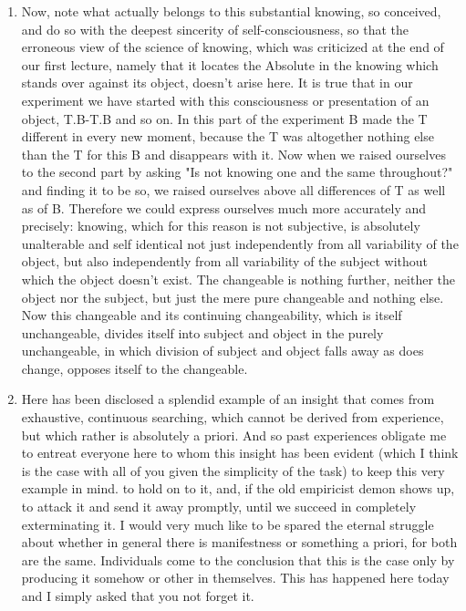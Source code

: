 \documentclass{article}
\begin{document}
\begin{enumerate}

\item 

Now, note what actually belongs to this substantial knowing, so conceived,
and do so with the deepest sincerity of self-consciousness,
so that the erroneous view of the science of knowing,
which was criticized at the end of our first lecture,
namely that it locates the Absolute in the knowing
which stands over against its object, doesn't arise here.
It is true that in our experiment we have started with
this consciousness or presentation of an object,
T.B-T.B and so on.
In this part of the experiment B made the T different in every new moment,
because the T was altogether nothing else than the T for this B and disappears with it.
Now when we raised ourselves to the second part by asking
"Is not knowing one and the same throughout?"
and finding it to be so, we raised ourselves
above all differences of T as well as of B.
Therefore we could express ourselves much more accurately and precisely:
knowing, which for this reason is not subjective,
is absolutely unalterable and self identical
not just independently from all variability of the object,
but also independently from all variability of the subject
without which the object doesn't exist.
The changeable is nothing further, neither the object nor the subject,
but just the mere pure changeable and nothing else.
Now this changeable and its continuing changeability,
which is itself unchangeable,
divides itself into subject and object
in the purely unchangeable,
in which division of subject and object falls away as does change,
opposes itself to the changeable.

\item

Here has been disclosed a splendid example of an insight
that comes from exhaustive, continuous searching,
which cannot be derived from experience,
but which rather is absolutely a priori.
And so past experiences obligate me to entreat everyone here
to whom this insight has been evident
(which I think is the case with all of you given the simplicity of the task)
to keep this very example in mind. to hold on to it,
and, if the old empiricist demon shows up,
to attack it and send it away promptly,
until we succeed in completely exterminating it.
I would very much like to be spared the eternal struggle about 
whether in general there is manifestness or something a priori,
for both are the same.
Individuals come to the conclusion that this is the case
only by producing it somehow or other in themselves.
This has happened here today and I simply asked that you not forget it.

\end{enumerate}
\end{document}
